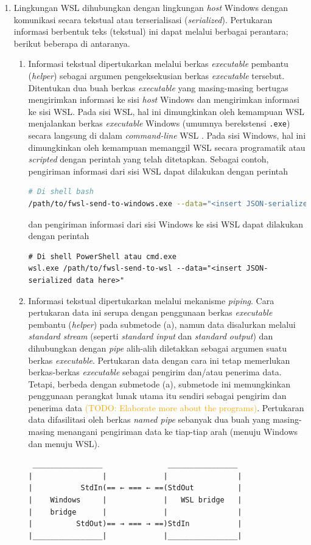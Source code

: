 \begin{enumerate}
    \item Lingkungan WSL dihubungkan dengan lingkungan \textit{host} Windows dengan komunikasi secara tekstual atau terserialisasi (\textit{serialized}). Pertukaran informasi berbentuk teks (tekstual) ini dapat melalui berbagai perantara; berikut beberapa di antaranya.
    \begin{enumerate}
        \item Informasi tekstual dipertukarkan melalui berkas \textit{executable} pembantu (\textit{helper}) sebagai argumen pengeksekusian berkas \textit{executable} tersebut. Ditentukan dua buah berkas \textit{executable} yang masing-masing bertugas mengirimkan informasi ke sisi \textit{host} Windows dan mengirimkan informasi ke sisi WSL. Pada sisi WSL, hal ini dimungkinkan oleh kemampuan WSL menjalankan berkas \textit{executable} Windows (umumnya berekstensi \verb|.exe|) secara langsung di dalam \textit{command-line} WSL \cite{msdocs-run-windows-tools-from-linux}. Pada sisi Windows, hal ini dimungkinkan oleh kemampuan memanggil WSL secara programatik atau \textit{scripted} dengan perintah yang telah ditetapkan. Sebagai contoh, pengiriman informasi dari sisi WSL dapat dilakukan dengan perintah
        \begin{lstlisting}[language=bash]
# Di shell bash
/path/to/fwsl-send-to-windows.exe --data="<insert JSON-serialized data here>"\end{lstlisting}
        dan pengiriman informasi dari sisi Windows ke sisi WSL dapat dilakukan dengan perintah
        \begin{lstlisting}
# Di shell PowerShell atau cmd.exe
wsl.exe /path/to/fwsl-send-to-wsl --data="<insert JSON-serialized data here>"\end{lstlisting}

        \item Informasi tekstual dipertukarkan melalui mekanisme \textit{piping}. Cara pertukaran data ini serupa dengan penggunaan berkas \textit{executable} pembantu (\textit{helper}) pada submetode (a), namun data disalurkan melalui \textit{standard stream} (seperti \textit{standard input} dan \textit{standard output}) dan dihubungkan dengan \textit{pipe} alih-alih diletakkan sebagai argumen suatu berkas \textit{executable}. Pertukaran data dengan cara ini tetap memerlukan berkas-berkas \textit{executable} sebagai pengirim dan/atau penerima data. Tetapi, berbeda dengan submetode (a), submetode ini memungkinkan penggunaan perangkat lunak utama itu sendiri sebagai pengirim dan penerima data \textcolor{orange}{(TODO: Elaborate more about the programs)}. Pertukaran data difasilitasi oleh berkas \textit{named pipe} sebanyak dua buah yang masing-masing menangani pengiriman data ke tiap-tiap arah (menuju Windows dan menuju WSL).
        \begin{verbatim}
 ________________               ________________
|                |             |                |
|           StdIn(== ← === ← ==(StdOut          |
|    Windows     |             |   WSL bridge   |
|    bridge      |             |                |
|          StdOut)== → === → ==)StdIn           |
|________________|             |________________|


\end{verbatim}
\end{enumerate}
\end{enumerate}
